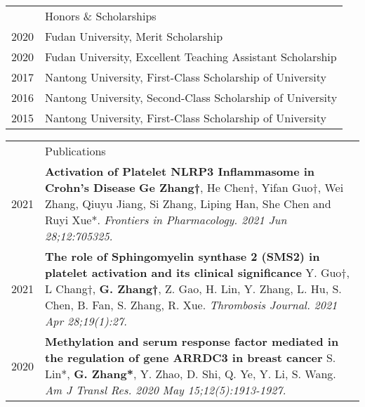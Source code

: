 \documentclass[letterpaper, 11pt]{article}
\newcommand{\headingfont}{\Large\color{LimeGreen}}
\newenvironment{SectionTable}[1]{
	\renewcommand*{\arraystretch}{1.7}
	\setlength{\tabcolsep}{10pt}
	\begin{longtable}{Rp{5.2in}} & #1 \\}
{\end{longtable}\vspace{-.3cm}}
\newenvironment{SectionTableSingleSpace}[1]{
	\renewcommand*{\arraystretch}{1.2}
	\setlength{\tabcolsep}{10pt}
	\begin{longtable}{Rp{5.2in}} & #1 \\[0.6em]}
{\end{longtable}\vspace{-.3cm}}
\begin{document}

\begin{SectionTableSingleSpace}{\headingfont Honors \& Scholarships}
2020 & 
Fudan University, Merit Scholarship \\

2020 &
Fudan University, Excellent Teaching Assistant Scholarship \\

2017 &
Nantong University, First-Class Scholarship of University \\

2016 &
Nantong University, Second-Class Scholarship of University  \\

2015 &
Nantong University, First-Class Scholarship of University 
\end{SectionTableSingleSpace}


\begin{SectionTable}{\headingfont Publications} 
2021 & 
\textbf{Activation of Platelet NLRP3 Inflammasome in Crohn's Disease} \newline
\textbf{Ge Zhang†}, He Chen†, Yifan Guo†, Wei Zhang, Qiuyu Jiang, Si Zhang, Liping Han, She Chen and Ruyi Xue*. \newline
\textit{Frontiers in Pharmacology. 2021 Jun 28;12:705325.} \\

2021 & 
\textbf{The role of Sphingomyelin synthase 2 (SMS2) in platelet activation and its clinical significance} \newline
Y. Guo†, L Chang†, \textbf{G. Zhang†}, Z. Gao, H. Lin, Y. Zhang, L. Hu, S. Chen, B. Fan, S. Zhang, R. Xue. \newline
\textit{Thrombosis Journal. 2021 Apr 28;19(1):27.} \\

2020 & 
\textbf{Methylation and serum response factor mediated in the regulation of gene ARRDC3 in breast cancer} \newline
S. Lin*, \textbf{G. Zhang*}, Y. Zhao, D. Shi, Q. Ye, Y. Li, S. Wang. \newline
\textit{Am J Transl Res. 2020 May 15;12(5):1913-1927.}
\end{SectionTable}

\end{document}
